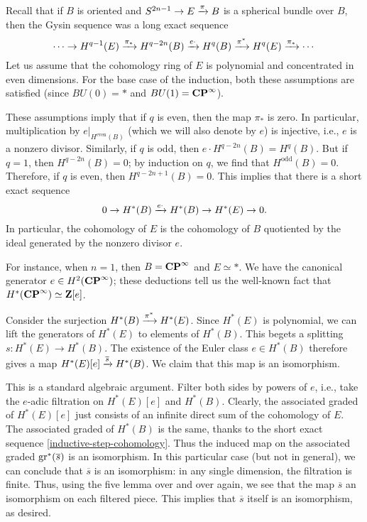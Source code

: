Recall that if $B$ is oriented and $S^{2n-1}\to E\xrightarrow{{\pi}} B$ is a spherical
bundle over $B$, then the Gysin sequence was a long exact sequence
$$
\cdots\to H^{q-1}(E) \xrightarrow{{\pi_\ast}} H^{q-2n}(B) \xrightarrow{{e\cdot}} H^q(B) \xrightarrow{{\pi^\ast}} H^q(E) \xrightarrow{{\pi_\ast}} \cdots
$$
Let us assume that the cohomology ring of $E$ is polynomial and concentrated in
even dimensions. For the base case of the induction, both these assumptions are
satisfied (since $BU(0) = \ast$ and $BU(1) = \mathbf{CP}^\infty$).

These assumptions imply that if $q$ is even, then the map $\pi_\ast$ is zero.
In particular, multiplication by $e|_{H^\mathrm{even}(B)}$ (which we will also
denote by $e$) is injective, i.e., $e$ is a nonzero divisor.  Similarly, if $q$
is odd, then $e\cdot H^{q-2n}(B) = H^q(B)$. But if $q=1$, then $H^{q-2n}(B) =
0$; by induction on $q$, we find that $H^\mathrm{odd}(B) = 0$. Therefore, if
$q$ is even, then $H^{q-2n+1}(B) = 0$. This implies that there is a short exact
sequence
\begin{equation}\label{inductive-step-cohomology}
    0\to H^\ast(B) \xrightarrow{{e\cdot}} H^\ast(B) \to H^\ast(E) \to 0.
\end{equation}
In particular, the cohomology of $E$ is the cohomology of $B$ quotiented by the
ideal generated by the nonzero divisor $e$.

For instance, when $n=1$, then $B=\mathbf{CP}^\infty$ and $E\simeq \ast$. We have the
canonical generator $e\in H^2(\mathbf{CP}^\infty)$; these deductions tell us the
well-known fact that $H^\ast(\mathbf{CP}^\infty) \simeq \mathbf Z[e]$.

Consider the surjection $H^\ast(B) \xrightarrow{{\pi^\ast}} H^\ast(E)$. Since $H^\ast(E)$
is polynomial, we can lift the generators of $H^\ast(E)$ to elements of
$H^\ast(B)$. This begets a splitting $s:H^\ast(E) \to H^\ast(B)$. The existence
of the Euler class $e\in H^\ast(B)$ therefore gives a map $H^\ast(E)[e]
\xrightarrow{{\overline{s}}} H^\ast(B)$. We claim that this map is an isomorphism.

This is a standard algebraic argument. Filter both sides by powers of $e$,
i.e., take the $e$-adic filtration on $H^\ast(E)[e]$ and $H^\ast(B)$. Clearly,
the associated graded of $H^\ast(E)[e]$ just consists of an infinite direct sum
of the cohomology of $E$. The associated graded of $H^\ast(B)$ is the same,
thanks to the short exact sequence \eqref{inductive-step-cohomology}. Thus the
induced map on the associated graded $\mathrm{gr}^\ast(\overline{s})$ is an
isomorphism. In this particular case (but not in general), we can conclude that
$\overline{s}$ is an isomorphism: in any single dimension, the filtration is
finite. Thus, using the five lemma over and over again, we see that the map
$\overline{s}$ an isomorphism on each filtered piece. This implies that
$\overline{s}$ itself is an isomorphism, as desired.
	
